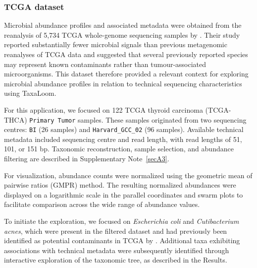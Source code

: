 \documentclass[pdflatex,sn-vancouver-num]{sn-jnl}%
\theoremstyle{thmstyleone}%
\theoremstyle{thmstyletwo}%
\theoremstyle{thmstylethree}%
\begin{document}

\subsubsection*{TCGA dataset}


Microbial abundance profiles and associated metadata were obtained from the reanalysis of 5,734 TCGA whole-genome sequencing samples by \citet{ge_comprehensive_2025}. Their study reported substantially fewer microbial signals than previous metagenomic reanalyses of TCGA data \citep{narunsky-haziza_pan-cancer_2022,sepich-poore_robustness_2024} and suggested that several previously reported species may represent known contaminants rather than tumour-associated microorganisms. This dataset therefore provided a relevant context for exploring microbial abundance profiles in relation to technical sequencing characteristics using TaxaLoom.

For this application, we focused on 122 TCGA thyroid carcinoma (TCGA-THCA) \texttt{Primary Tumor} samples. These samples originated from two sequencing centres: \texttt{BI} (26 samples) and \texttt{Harvard\_GCC\_02} (96 samples). Available technical metadata included sequencing centre and read length, with read lengths of 51, 101, or 151 bp. Taxonomic reconstruction, sample selection, and abundance filtering are described in Supplementary Note~\ref{secA3}.

For visualization, abundance counts were normalized using the geometric mean of pairwise ratios (GMPR) method. The resulting normalized abundances were displayed on a logarithmic scale in the parallel coordinates and swarm plots to facilitate comparison across the wide range of abundance values.

To initiate the exploration, we focused on \textit{Escherichia coli} and \textit{Cutibacterium acnes}, which were present in the filtered dataset and had previously been identified as potential contaminants in TCGA by \citet{ge_comprehensive_2025}. Additional taxa exhibiting associations with technical metadata were subsequently identified through interactive exploration of the taxonomic tree, as described in the Results.
\end{document}
